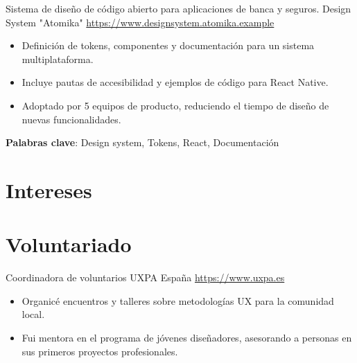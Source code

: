 \documentclass[a4paper, serif, 10pt]{moderncv}
\begin{document}
        {Sistema de diseño de código abierto para aplicaciones de banca y seguros.}
        {Design System "Atomika"}
        {\url{https://www.designsystem.atomika.example}}
        {}
        {\begin{itemize}
\item Definición de tokens, componentes y documentación para un sistema multiplataforma.
\item Incluye pautas de accesibilidad y ejemplos de código para React Native.
\item Adoptado por 5 equipos de producto, reduciendo el tiempo de diseño de nuevas funcionalidades.
\end{itemize}
\textbf{Palabras clave}: Design system, Tokens, React, Documentación}
\section{Intereses}

\section{Voluntariado}

        {Coordinadora de voluntarios}
        {UXPA España}
        {\url{https://www.uxpa.es}}
        {}
        {\begin{itemize}
\item Organicé encuentros y talleres sobre metodologías UX para la comunidad local.
\item Fui mentora en el programa de jóvenes diseñadores, asesorando a personas en sus primeros proyectos profesionales.
\end{itemize}}
\end{document}
